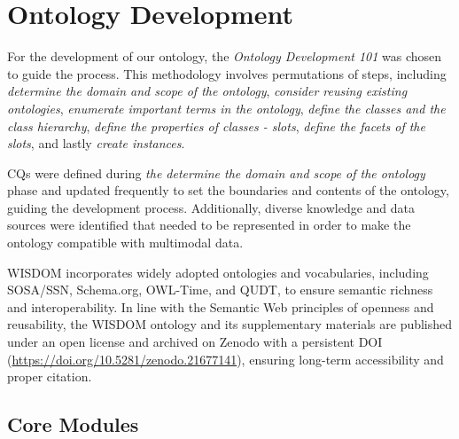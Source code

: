 \documentclass[
]{ceurart}
\begin{document}
\section{Ontology Development} \label{sec:development}
For the development of our ontology, the \textit{Ontology Development 101} \cite{mcguinness2004ontology} was chosen to guide the process. This methodology involves permutations of steps, including \textit{determine the domain and scope of the ontology}, \textit{consider reusing existing ontologies}, \textit{enumerate important terms in the ontology}, \textit{define the classes and the class hierarchy}, \textit{define the properties of classes - slots}, \textit{define the facets of the slots}, and lastly \textit{create instances}.

CQs were defined during \textit{the determine the domain and scope of the ontology} phase and updated frequently to set the boundaries and contents of the ontology, guiding the development process. Additionally, diverse knowledge and data sources were identified that needed to be represented in order to make the ontology compatible with multimodal data.

WISDOM incorporates widely adopted ontologies and vocabularies, including SOSA/SSN, Schema.org, OWL-Time, and QUDT, to ensure semantic richness and interoperability. In line with the Semantic Web principles of openness and reusability, the WISDOM ontology and its supplementary materials are published under an open license and archived on Zenodo with a persistent DOI (\href{https://doi.org/10.5281/zenodo.21677141}{https://doi.org/10.5281/zenodo.21677141}), ensuring long-term accessibility and proper citation.

\subsection{Core Modules}
\end{document}
